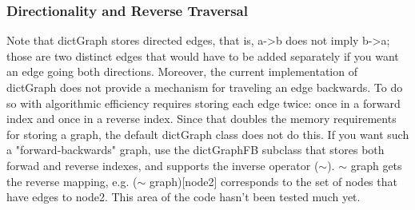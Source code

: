 \documentclass{howto}
\begin{document}
\subsubsection{Directionality and Reverse Traversal}

Note that dictGraph stores directed edges, that is, a->b does not imply b->a; those are two distinct edges that would have to be added separately if you want an edge going both directions.  Moreover, the current implementation of dictGraph does not provide a mechanism for traveling an edge backwards.  To do so with algorithmic efficiency requires storing each edge twice: once in a forward index and once in a reverse index.  Since that doubles the memory requirements for storing a graph, the default dictGraph class does not do this.  If you want such a "forward-backwards" graph, use the dictGraphFB subclass that stores both forwad and reverse indexes, and supports the inverse operator ($\sim$).  $\sim$ graph gets the reverse mapping, e.g. ($\sim$ graph)[node2] corresponds to the set of nodes that have edges to node2.  This area of the code hasn't been tested much yet.
\end{document}
